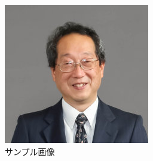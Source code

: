 \begin{figure}[htpb]
  \centering
  \includegraphics[width=0.4\linewidth]{sample/snippets/takada.jpg}
  \caption{サンプル画像}
  \label{fig:takada}
\end{figure}
